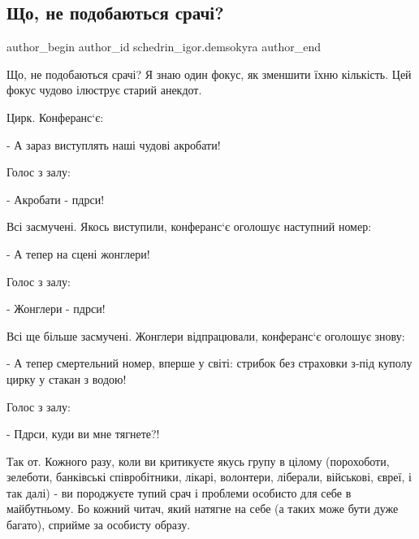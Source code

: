  
 
 
 
 

\subsection{Що, не подобаються срачі?}
\label{sec:11_12_2022.fb.schedrin_igor.demsokyra.1.shcho__ne_podobayuts}

\ifcmt
 author_begin
   author_id schedrin_igor.demsokyra
 author_end
\fi

Що, не подобаються срачі? Я знаю один фокус, як зменшити їхню кількість. Цей
фокус чудово ілюструє старий анекдот.

Цирк. Конферанс‘є:

- А зараз виступлять наші чудові акробати!

Голос з залу:

- Акробати - пдрси!

Всі засмучені. Якось виступили, конферанс‘є оголошує наступний номер:

- А тепер на сцені жонглери!

Голос з залу:

- Жонглери - пдрси!

Всі ще більше засмучені. Жонглери відпрацювали, конферанс‘є оголошує знову:

- А тепер смертельний номер, вперше у світі: стрибок без страховки з-під куполу
цирку у стакан з водою!

Голос з залу: 

- Пдрси, куди ви мне тягнете?!

Так от. Кожного разу, коли ви критикуєте якусь групу в цілому (порохоботи,
зелеботи, банківські співробітники, лікарі, волонтери, ліберали, військові,
євреї, і так далі) - ви породжуєте тупий срач і проблеми особисто для себе в
майбутньому. Бо кожний читач, який натягне на себе (а таких може бути дуже
багато), сприйме за особисту образу. 

